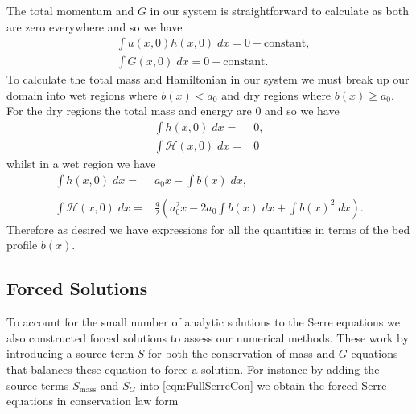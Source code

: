 The total momentum and $G$ in our system is straightforward to calculate as both are zero everywhere and so we have 
\begin{align}
&\int u(x,0)h(x,0) \;  dx = {} 0 + \text{constant}, \\
&\int G(x,0) \; dx = {} 0 + \text{constant}.
\end{align}
To calculate the total mass and Hamiltonian in our system we must break up our domain into wet regions where $b(x) < a_0$ and dry regions where $b(x) \ge a_0$. For the dry regions the total mass and energy are $0$ and so we have 
 \begin{subequations}
 	\begin{align}
 	\int h(x,0) \; dx = {} & 0 , \\
 	\int \mathcal{H}(x,0) \; dx = {} & 0
 	\end{align}
 \end{subequations}
 whilst in a wet region we have 
  \begin{subequations}
  	\begin{align}
  	\int h(x,0) \; dx = {} & a_0 x -  \int b(x) \; dx , \\  \nonumber \\
  	\int \mathcal{H}(x,0) \; dx = {} & \frac{g}{2} \left(a_0^2x  -  2a_0 \int b(x) \; dx + \int b(x)^2 \; dx \right).
  	\end{align}
  \end{subequations}
Therefore as desired we have expressions for all the quantities in terms of the bed profile $b(x)$. 


\subsection{Forced Solutions}
To account for the small number of analytic solutions to the Serre equations we also constructed forced solutions to assess our numerical methods. These work by introducing a source term $S$ for both the conservation of mass and $G$ equations that balances these equation to force a solution. For instance by adding the source terms $S_{\text{mass}}$ and $S_{G}$ into \eqref{eqn:FullSerreCon} we obtain the forced Serre equations in conservation law form

